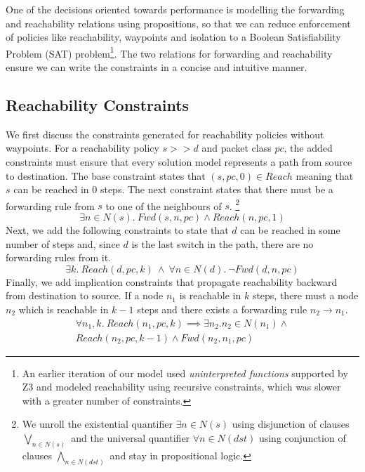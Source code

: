 One of the decisions oriented towards performance is modelling the forwarding and reachability relations using propositions, so that we can reduce enforcement of policies like reachability, waypoints and isolation to a Boolean Satisfiability Problem (SAT) problem\footnote{An earlier iteration of our model used \emph{uninterpreted functions} supported by Z3 and modeled reachability using recursive constraints, 
	which was slower with a greater number of constraints.}. 
The two relations for forwarding and reachability ensure we can write the constraints in a concise and intuitive manner.

\subsection{Reachability Constraints} \label{sec:reach}
We first discuss the constraints generated for reachability policies without waypoints.
For a reachability policy $s >> d$ and packet class $pc$, the added constraints must ensure that 
every solution model represents a path 
from source to destination. 
The base constraint states that $(s, pc,0) \in Reach$ meaning
that $s$ can be reached in $0$ steps. 
The next constraint states that there must be a forwarding rule from $s$ to one of
the neighbours of $s$.
\footnote{
	We unroll the existential quantifier $\exists n \in N(s)$ using disjunction of 
	clauses $\bigvee\limits_{n \in N(s)}$ and
	the universal quantifier $\forall n \in N(dst)$ using conjunction of clauses $\bigwedge\limits_{n \in N(dst)}$
	and stay in propositional logic.} 
\begin{equation} \label{eq:src}
	\exists n \in N(s).~Fwd(s, n, pc) \wedge Reach(n, pc, 1)
\end{equation}
Next, we add the following constraints to state that $d$ can be reached in some number of steps and,
since $d$ is the last switch in the path, there are no forwarding rules from it.
\begin{equation} \label{eq:dst}
	\exists k.~Reach(d, pc, k) \ \wedge \ \forall n \in N(d). \ \neg Fwd(d, n, pc)
\end{equation}
Finally, we add implication constraints that propagate reachability backward from destination to source. 
If a node $n_1$ is reachable in $k$ steps, there must a node $n_2$ which is reachable in  $k-1$ steps and there exists a forwarding rule $n_2 \rightarrow n_1$.
\begin{multline} \label{eq:bckprop}
\forall n_1,k.~ Reach(n_1,pc,k) \implies \exists n_2.  n_2 \in N(n_1) \wedge \\ Reach(n_2,pc,k-1) \wedge Fwd(n_2,n_1,pc)
\end{multline} 
